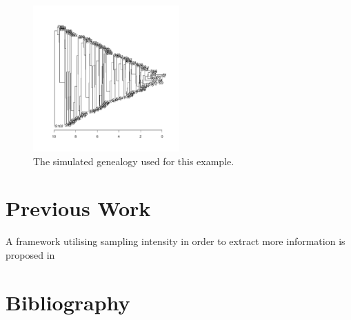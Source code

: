 \documentclass{report}
\theoremstyle{definition}
\begin{document}
\begin{figure}[H]
  \centering
    \includegraphics[width=0.5\textwidth]{../R/tree}
    \caption{The simulated genealogy used for this example.}
\end{figure}
\section{Previous Work}
A framework utilising sampling intensity in order to extract more information is proposed in \cite{parag_jointly_nodate}
\section{Bibliography}
\printbibliography
\end{document}
